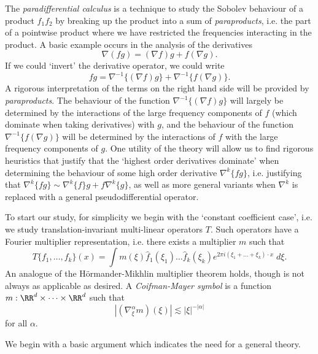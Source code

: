 The \emph{paradifferential calculus} is a technique to study the Sobolev behaviour of a product $f_1 f_2$ by breaking up the product into a sum of \emph{paraproducts}, i.e. the part of a pointwise product where we have restricted the frequencies interacting in the product. A basic example occurs in the analysis of the derivatives
%
\[ \nabla(f g) = (\nabla f) g + f (\nabla g). \]
%
If we could `invert' the derivative operator, we could write
%
\[ f g = \nabla^{-1} \{ (\nabla f) g \} + \nabla^{-1} \{ f (\nabla g) \}. \]
%
A rigorous interpretation of the terms on the right hand side will be provided by \emph{paraproducts}. The behaviour of the function $\nabla^{-1} \{ (\nabla f) g \}$ will largely be determined by the interactions of the large frequency components of $f$ (which dominate when taking derivatives) with $g$, and the behaviour of the function $\nabla^{-1} \{ f (\nabla g) \}$ will be determined by the interactions of $f$ with the large frequency components of $g$. One utility of the theory will allow us to find rigorous heuristics that justify that the `highest order derivatives dominate' when determining the behaviour of some high order derivative $\nabla^k \{ fg \}$, i.e. justifying that $\nabla^k \{ fg \} \sim \nabla^k \{ f \} g + f \nabla^k \{ g \}$, as well as more general variants when $\nabla^k$ is replaced with a general pseudodifferential operator.

To start our study, for simplicity we begin with the `constant coefficient case', i.e. we study translation-invariant multi-linear operators $T$. Such operators have a Fourier multiplier representation, i.e. there exists a multiplier $m$ such that
%
\[ T \{ f_1, \dots, f_k \}(x) = \int m(\xi) \widehat{f}_1(\xi_1) \dots \widehat{f}_k(\xi_k) e^{2 \pi i (\xi_1 + \dots + \xi_k) \cdot x}\; d\xi. \]
%
An analogue of the H\"{o}rmander-Mikhlin multiplier theorem holds, though is not always as applicable as desired. A \emph{Coifman-Mayer symbol} is a function $m: \RR^d \times \dots \times \RR^d$ such that
%
\[ |(\nabla^\alpha_\xi m)(\xi)| \lesssim |\xi|^{-|\alpha|} \]
%
for all $\alpha$.





We begin with a basic argument which indicates the need for a general theory.

